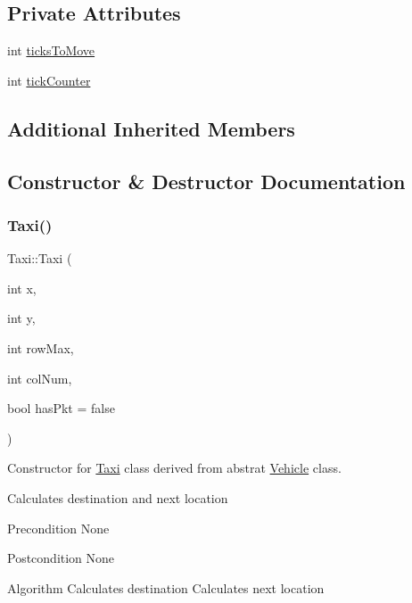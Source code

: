 \subsection*{Private Attributes}
\begin{DoxyCompactItemize}
\item 
int \hyperlink{class_taxi_adf5a19300ef6848794fa79adf3b7bc5a}{ticks\+To\+Move}
\item 
int \hyperlink{class_taxi_a0a4e5ff5819d2c7399791a1f2b51ad32}{tick\+Counter}
\end{DoxyCompactItemize}
\subsection*{Additional Inherited Members}


\subsection{Constructor \& Destructor Documentation}
\hypertarget{class_taxi_a94354d19d68c6cb60805debd9ac28880}{}\label{class_taxi_a94354d19d68c6cb60805debd9ac28880} 
\subsubsection{\texorpdfstring{Taxi()}{Taxi()}}
{\footnotesize\ttfamily Taxi\+::\+Taxi (\begin{DoxyParamCaption}\item[{int}]{x,  }\item[{int}]{y,  }\item[{int}]{row\+Max,  }\item[{int}]{col\+Num,  }\item[{bool}]{has\+Pkt = {\ttfamily false} }\end{DoxyParamCaption})}



Constructor for \hyperlink{class_taxi}{Taxi} class derived from abstrat \hyperlink{class_vehicle}{Vehicle} class. 

Calculates destination and next location

\begin{DoxyPrecond}{Precondition}
None
\end{DoxyPrecond}
\begin{DoxyPostcond}{Postcondition}
None
\end{DoxyPostcond}
\begin{DoxyParagraph}{Algorithm}
Calculates destination Calculates next location
\end{DoxyParagraph}

